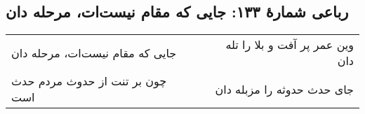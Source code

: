 \begin{center}
\section*{رباعی شمارهٔ ۱۳۳: جایی که مقام نیست‌ات، مرحله دان}
\label{sec:133}
\begin{longtable}{l p{0.5cm} r}
جایی که مقام نیست‌ات، مرحله دان
&&
وین عمر پر آفت و بلا را تله دان
\\
چون بر تنت از حدوث مردم حدث ا‌ست
&&
جای حدث حدوثه را مزبله دان
\\
\end{longtable}
\end{center}
